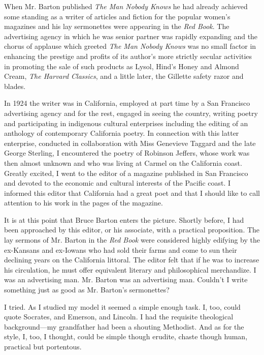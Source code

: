 \documentclass[twoside,nohyper,openany,nobib]{tufte-book}
\begin{document}
When Mr. Barton published \emph{The Man Nobody Knows} he had already
achieved some standing as a writer of articles and fiction for the
popular women's magazines and his lay sermonettes were appearing in the
\emph{Red Book}. The advertising agency in which he was senior partner
was rapidly expanding and the chorus of applause which greeted \emph{The
Man Nobody Knows} was no small factor in enhancing the prestige and
profits of its author's more strictly secular activities in promoting
the sale of such products as Lysol, Hind's Honey and Almond Cream,
\emph{The Harvard Classics}, and a little later, the Gillette safety
razor and blades.

In 1924 the writer was in California, employed at part time by a San
Francisco advertising agency and for the rest, engaged in seeing the
country, writing poetry and participating in indigenous cultural
enterprises including the editing of an anthology of contemporary
California poetry. In connection with this latter enterprise, conducted
in collaboration with Miss Genevieve Taggard and the late George
Sterling, I encountered the poetry of Robinson Jeffers, whose work was
then almost unknown and who was living at Carmel on the California
coast. Greatly excited, I went to the editor of a magazine published in
San Francisco and devoted to the economic and cultural interests of the
Pacific coast. I informed this editor that California had a great poet
and that I should like to call attention to his work in the pages of the
magazine.

\enlargethispage{\baselineskip}

It is at this point that Bruce Barton enters the picture. Shortly
before, I had been approached by this editor, or his associate, with a
practical proposition. The lay sermons of Mr. Barton in the \emph{Red
Book} were considered highly edifying by the ex-Kansans and ex-Iowans
who had sold their farms and come to sun their declining years on the
California littoral. The editor felt that if he was to increase his
circulation, he must offer equivalent literary and philosophical
merchandize. I was an advertising man. Mr. Barton was an advertising
man. Couldn't I write something just as good as Mr. Barton's
sermonettes?

I tried. As I studied my model it seemed a simple enough task. I, too,
could quote Socrates, and Emerson, and Lincoln. I had the requisite
theological background---my grandfather had been a shouting Methodist.
And as for the style, I, too, I thought, could be simple though erudite,
chaste though human, practical but portentous.
\end{document}
